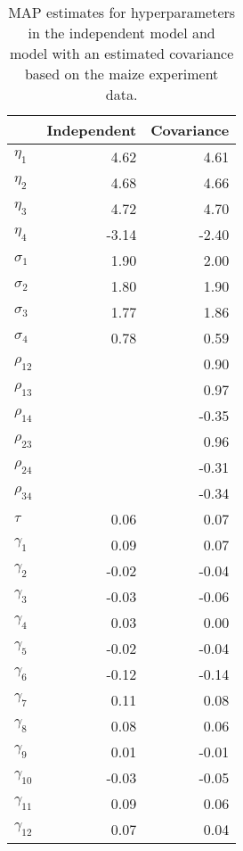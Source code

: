 \begin{table}[ht]
\centering
\caption{MAP estimates for hyperparameters in the independent model and model with an estimated covariance based on the maize experiment data.} 
\label{t:map}
\begin{tabular}{l|rr|}
  \hline
 & Independent & Covariance \\ 
  \hline
$\eta_1$ & 4.62 & 4.61 \\ 
  $\eta_2$ & 4.68 & 4.66 \\ 
  $\eta_3$ & 4.72 & 4.70 \\ 
  $\eta_4$ & -3.14 & -2.40 \\ 
   \hline
$\sigma_1$ & 1.90 & 2.00 \\ 
  $\sigma_2$ & 1.80 & 1.90 \\ 
  $\sigma_3$ & 1.77 & 1.86 \\ 
  $\sigma_4$ & 0.78 & 0.59 \\ 
   \hline
$\rho_{12}$ &  & 0.90 \\ 
  $\rho_{13}$ &  & 0.97 \\ 
  $\rho_{14}$ &  & -0.35 \\ 
  $\rho_{23}$ &  & 0.96 \\ 
  $\rho_{24}$ &  & -0.31 \\ 
  $\rho_{34}$ &  & -0.34 \\ 
   \hline
$\tau$ & 0.06 & 0.07 \\ 
   \hline
$\gamma_{1}$ & 0.09 & 0.07 \\ 
  $\gamma_{2}$ & -0.02 & -0.04 \\ 
  $\gamma_{3}$ & -0.03 & -0.06 \\ 
  $\gamma_{4}$ & 0.03 & 0.00 \\ 
  $\gamma_{5}$ & -0.02 & -0.04 \\ 
  $\gamma_{6}$ & -0.12 & -0.14 \\ 
  $\gamma_{7}$ & 0.11 & 0.08 \\ 
  $\gamma_{8}$ & 0.08 & 0.06 \\ 
  $\gamma_{9}$ & 0.01 & -0.01 \\ 
  $\gamma_{10}$ & -0.03 & -0.05 \\ 
  $\gamma_{11}$ & 0.09 & 0.06 \\ 
  $\gamma_{12}$ & 0.07 & 0.04 \\ 
   \hline
\end{tabular}
\end{table}
